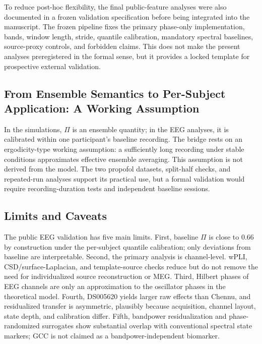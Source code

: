 \documentclass[11pt,a4paper]{article}
\theoremstyle{plain}
\theoremstyle{definition}
\theoremstyle{remark}
\begin{document}
To reduce post-hoc flexibility, the final public-feature analyses were also documented in a frozen validation specification before being integrated into the manuscript. The frozen pipeline fixes the primary phase-only implementation, bands, window length, stride, quantile calibration, mandatory spectral baselines, source-proxy controls, and forbidden claims. This does not make the present analyses preregistered in the formal sense, but it provides a locked template for prospective external validation.

\subsection{From Ensemble Semantics to Per-Subject Application: A Working Assumption}
\label{sec:pilot-bridge}

In the simulations, $\Pi$ is an ensemble quantity; in the EEG analyses, it is calibrated within one participant's baseline recording. The bridge rests on an ergodicity-type working assumption: a sufficiently long recording under stable conditions approximates effective ensemble averaging. This assumption is not derived from the model. The two propofol datasets, split-half checks, and repeated-run analyses support its practical use, but a formal validation would require recording-duration tests and independent baseline sessions.

\subsection{Limits and Caveats}
\label{sec:pilot-limits}

The public EEG validation has five main limits. First, baseline $\Pi$ is close to $0.66$ by construction under the per-subject quantile calibration; only deviations from baseline are interpretable. Second, the primary analysis is channel-level. wPLI, CSD/surface-Laplacian, and template-source checks reduce but do not remove the need for individualized source reconstruction or MEG. Third, Hilbert phases of EEG channels are only an approximation to the oscillator phases in the theoretical model. Fourth, DS005620 yields larger raw effects than Chennu, and residualized transfer is asymmetric, plausibly because acquisition, channel layout, state depth, and calibration differ. Fifth, bandpower residualization and phase-randomized surrogates show substantial overlap with conventional spectral state markers; GCC is not claimed as a bandpower-independent biomarker.
\end{document}
